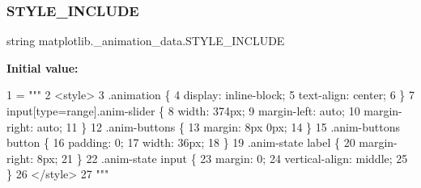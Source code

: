 \subsubsection{\texorpdfstring{S\+T\+Y\+L\+E\+\_\+\+I\+N\+C\+L\+U\+DE}{STYLE\_INCLUDE}}
{\footnotesize\ttfamily string matplotlib.\+\_\+animation\+\_\+data.\+S\+T\+Y\+L\+E\+\_\+\+I\+N\+C\+L\+U\+DE}

{\bfseries Initial value\+:}
\begin{DoxyCode}
1 =  \textcolor{stringliteral}{"""}
2 \textcolor{stringliteral}{<style>}
3 \textcolor{stringliteral}{.animation \{}
4 \textcolor{stringliteral}{    display: inline-block;}
5 \textcolor{stringliteral}{    text-align: center;}
6 \textcolor{stringliteral}{\}}
7 \textcolor{stringliteral}{input[type=range].anim-slider \{}
8 \textcolor{stringliteral}{    width: 374px;}
9 \textcolor{stringliteral}{    margin-left: auto;}
10 \textcolor{stringliteral}{    margin-right: auto;}
11 \textcolor{stringliteral}{\}}
12 \textcolor{stringliteral}{.anim-buttons \{}
13 \textcolor{stringliteral}{    margin: 8px 0px;}
14 \textcolor{stringliteral}{\}}
15 \textcolor{stringliteral}{.anim-buttons button \{}
16 \textcolor{stringliteral}{    padding: 0;}
17 \textcolor{stringliteral}{    width: 36px;}
18 \textcolor{stringliteral}{\}}
19 \textcolor{stringliteral}{.anim-state label \{}
20 \textcolor{stringliteral}{    margin-right: 8px;}
21 \textcolor{stringliteral}{\}}
22 \textcolor{stringliteral}{.anim-state input \{}
23 \textcolor{stringliteral}{    margin: 0;}
24 \textcolor{stringliteral}{    vertical-align: middle;}
25 \textcolor{stringliteral}{\}}
26 \textcolor{stringliteral}{</style>}
27 \textcolor{stringliteral}{"""}
\end{DoxyCode}
